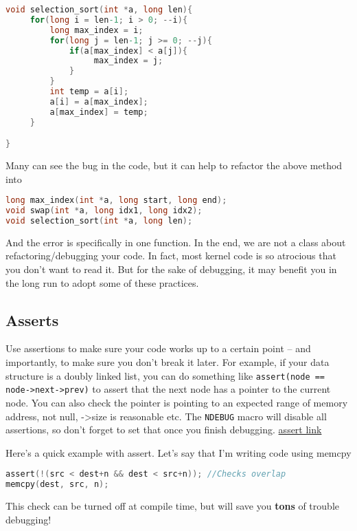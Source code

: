 \begin{lstlisting}[language=C]
void selection_sort(int *a, long len){
     for(long i = len-1; i > 0; --i){
         long max_index = i;
         for(long j = len-1; j >= 0; --j){
             if(a[max_index] < a[j]){
                  max_index = j;
             }
         }
         int temp = a[i];
         a[i] = a[max_index];
         a[max_index] = temp;
     }

}
\end{lstlisting}

Many can see the bug in the code, but it can help to refactor the above
method into

\begin{lstlisting}[language=C]
long max_index(int *a, long start, long end);
void swap(int *a, long idx1, long idx2);
void selection_sort(int *a, long len);
\end{lstlisting}

And the error is specifically in one function. In the end, we are not a class about refactoring/debugging your code. In fact, most kernel code is so atrocious that you don't want to read it. But for the sake of debugging, it may benefit you in the long run to adopt some of these practices.

\subsection{Asserts}\label{asserts}

Use assertions to make sure your code works up to a certain point -- and importantly, to make sure you don't break it later.
For example, if your data structure is a doubly linked list, you can do something like \texttt{assert(node == node->next->prev)} to assert that the next node has a pointer to the current node.
You can also check the pointer is pointing to an expected range of memory address, not null, -\textgreater{}size is reasonable etc.
The \texttt{NDEBUG} macro will disable all assertions, so don't forget to set that once you finish debugging. \href{http://www.cplusplus.com/reference/cassert/assert/}{assert link}

Here's a quick example with assert. Let's say that I'm writing code using memcpy

\begin{lstlisting}[language=C]
assert(!(src < dest+n && dest < src+n)); //Checks overlap
memcpy(dest, src, n);
\end{lstlisting}

This check can be turned off at compile time, but will save you \textbf{tons} of trouble debugging!

